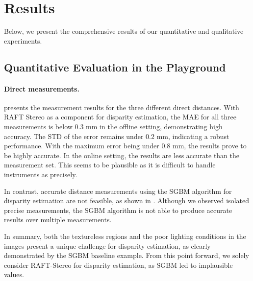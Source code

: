 \documentclass[letterpaper]{article} %
\begin{document}
\section{Results}
\label{sec:results}

Below, we present the comprehensive results of our quantitative and qualitative experiments.

\subsection{Quantitative Evaluation in the Playground}

\paragraph{Direct measurements.} 
 presents the measurement results for the three different direct distances. With RAFT Stereo as a component for disparity estimation, the MAE for all three measurements is below $0.3$ mm in the offline setting, demonstrating high accuracy. The STD of the error remains under $0.2$ mm, indicating a robust performance. With the maximum error being under 0.8 mm, the results prove to be highly accurate. In the online setting, the results are less accurate than the measurement set. This seems to be plausible as it is difficult to handle instruments as precisely.

In contrast, accurate distance measurements using the SGBM algorithm for disparity estimation are not feasible, as shown in . Although we observed isolated precise measurements, the SGBM algorithm is not able to produce accurate results over multiple measurements. 

In summary, both the textureless regions and the poor lighting conditions in the images present a unique challenge for disparity estimation, as clearly demonstrated by the SGBM baseline example. From this point forward, we solely consider RAFT-Stereo for disparity estimation, as SGBM led to implausible values.
\end{document}
